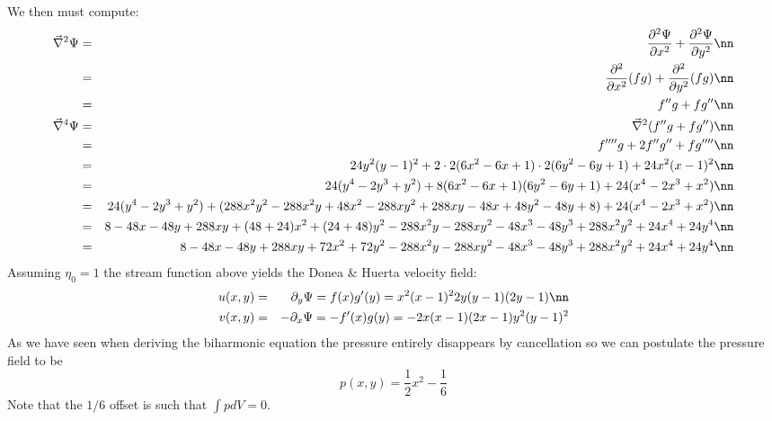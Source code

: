 We then must compute:
\begin{eqnarray}
\vec\nabla^2 \Psi 
&=& \frac{\partial^2 \Psi}{\partial x^2} +\frac{\partial^2 \Psi}{\partial y^2} \nn\\
&=& \frac{\partial^2 }{\partial x^2} (fg)  +\frac{\partial^2 }{\partial y^2} (fg)\nn\\
&=& f''g+ fg'' \nn\\
\vec\nabla^4 \Psi 
&=& \vec\nabla^2 (f''g+fg'') \nn\\
&=& f''''g +2f''g'' + fg'''' \nn\\
&=&24 y^2(y-1)^2 + 2 \cdot  2 (6x^2 -6x +1)  \cdot 2(6y^2 -6y+1)  + 24 x^2(x-1)^2\nn\\
&=&24 (y^4-2y^3+y^2)+8 (6x^2 -6x +1)  (6y^2 -6y+1)  + 24(x^4 -2x^3 +x^2)\nn\\
&=&24 (y^4-2y^3+y^2)+(288x^2y^2 -288 x^2y +48x^2 -288xy^2 +288xy-48x + 48y^2 -48y+8)+24(x^4 -2x^3+x^2)\nn\\
&=& 8 -48x -48y 
+ 288xy + (48+24)x^2 +(24+48)y^2 
-288x^2y -288xy^2 -48x^3 -48y^3 
+ 288x^2y^2+24x^4 + 24y^4\nn\\
&=& 8 -48x -48y + 288xy + 72x^2 +72y^2  -288x^2y -288xy^2 -48x^3 -48y^3 
+ 288x^2y^2+24x^4 + 24y^4 \nn
\end{eqnarray}
Assuming $\eta_0=1$ the stream function above yields the Donea \& Huerta velocity field:
\begin{eqnarray}
u(x,y) &=& \partial_y \Psi = f(x)g'(y) = x^2(x-1)^2 2y(y-1)(2y-1) \nn\\
v(x,y) &=& -\partial_x \Psi = -f'(x)g(y) = -2x(x-1)(2x -1)y^2(y-1)^2 
\end{eqnarray}
As we have seen when deriving the biharmonic equation the pressure 
entirely disappears by cancellation so we can postulate the pressure field to be 
\[
p(x,y) = \frac12 x^2 -\frac16
\]
Note that the $1/6$ offset is such that $\int p dV = 0$.

